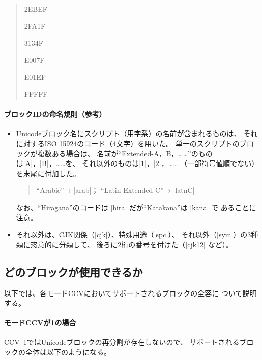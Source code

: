 \documentclass[uplatex,dvipdfmx,a4paper]{jsarticle}
\begin{document}
\begin{quote}
   {2EBEF} \par
{}   {2FA1F} \par
{}   {3134F} \par
{}   {E007F} \par
{}   {E01EF} \par
{}   {FFFFF} \par
{}   \par
\end{quote}

\paragraph{ブロックIDの命名規則\<（参考）}
\mbox{}
\begin{itemize}
\item Unicodeブロック名にスクリプト（用字系）の名前が含まれるものは、
  それに対するISO 15924のコード（4文字）を用いた。
  単一のスクリプトのブロックが複数ある場合は、
  名前が“Extended-A，B，……”のものは|A|，|B|，……を、
  それ以外のものは|1|，|2|，……
  （一部符号値順でない）を末尾に付加した。
  \begin{quote}
  “Arabic”→ |arab|； “Latin Extended-C”→ |latnC|
  \end{quote}
  なお、“Hiragana”のコードは |hira| だが“Katakana”は |kana| で
  あることに注意。
\item それ以外は、CJK関係（|cjk|）、特殊用途（|spc|）、
  それ以外（|sym|）の3種類に恣意的に分類して、
  後ろに2桁の番号を付けた（|cjk12| など）。
\end{itemize}

\subsection{どのブロックが使用できるか}

以下では、各モードCCVにおいてサポートされるブロックの全容に
ついて説明する。

\paragraph{モードCCVが1の場合}
CCV~1ではUnicodeブロックの再分割が存在しないので、
サポートされるブロックの全体は以下のようになる。
\end{document}
